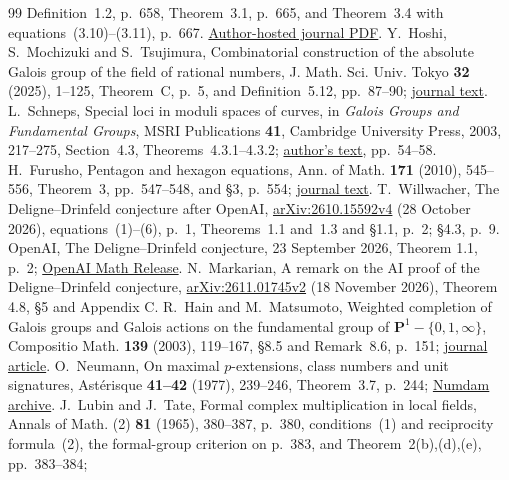 \documentclass[11pt,a4paper]{article}
\theoremstyle{definition}
\theoremstyle{remark}
\begin{document}
\begin{thebibliography}{99}
Definition~1.2, p.~658, Theorem~3.1, p.~665, and
Theorem~3.4 with equations~(3.10)--(3.11), p.~667.
\href{https://webusers.imj-prg.fr/~leila.schneps/automorphisms.pdf}{Author-hosted journal PDF}.
 Y.~Hoshi, S.~Mochizuki and S.~Tsujimura,
Combinatorial construction of the absolute Galois group of the field of
rational numbers, J. Math. Sci. Univ. Tokyo \textbf{32} (2025), 1--125,
Theorem~C, p.~5, and Definition~5.12, pp.~87--90;
\href{https://www.ms.u-tokyo.ac.jp/journal/32-1-1.pdf}{journal text}.
 L.~Schneps, Special loci in moduli spaces
of curves, in \emph{Galois Groups and Fundamental Groups}, MSRI
Publications \textbf{41}, Cambridge University Press, 2003, 217--275,
Section~4.3, Theorems~4.3.1--4.3.2;
\href{https://webusers.imj-prg.fr/~leila.schneps/MSRI.pdf}{author's text},
pp.~54--58.
 H.~Furusho, Pentagon and hexagon equations,
Ann. of Math. \textbf{171} (2010), 545--556,
Theorem~3, pp.~547--548, and \S3, p.~554;
\href{https://annals.math.princeton.edu/wp-content/uploads/annals-v171-n1-p13-p.pdf}{journal text}.
 T.~Willwacher, The Deligne--Drinfeld conjecture
after OpenAI, \href{https://arxiv.org/abs/2610.15592v4}{arXiv:2610.15592v4}
(28 October 2026), equations~(1)--(6), p.~1, Theorems~1.1 and~1.3 and
\S1.1, p.~2; \S4.3, p.~9.
 OpenAI, The Deligne--Drinfeld conjecture, 23 September
2026, Theorem 1.1, p.~2; \href{https://github.com/openai/math/blob/main/preprints/The-Deligne-Drinfeld-conjecture-September-23-2026/paper.pdf}{OpenAI Math Release}.
 N.~Markarian, A remark on the AI proof of the
Deligne--Drinfeld conjecture,
\href{https://arxiv.org/abs/2611.01745}{arXiv:2611.01745v2}
(18 November 2026), Theorem 4.8, \S5 and Appendix C.
 R.~Hain and M.~Matsumoto,
Weighted completion of Galois groups and Galois actions on the
fundamental group of $\mathbf P^1-\{0,1,\infty\}$,
Compositio Math. \textbf{139} (2003), 119--167,
\S8.5 and Remark~8.6, p.~151; \href{https://doi.org/10.1023/B:COMP.0000005077.42732.93}{journal article}.
 O.~Neumann, On maximal $p$-extensions, class numbers
and unit signatures, Ast\'erisque \textbf{41--42} (1977), 239--246,
Theorem~3.7, p.~244;
\href{https://www.numdam.org/article/AST_1977__41-42__239_0.pdf}{Numdam archive}.
 J.~Lubin and J.~Tate,
Formal complex multiplication in local fields,
Annals of Math. (2) \textbf{81} (1965), 380--387,
p.~380, conditions~(1) and reciprocity formula~(2), the formal-group
criterion on p.~383, and Theorem~2(b),(d),(e), pp.~383--384;

\end{thebibliography}
\end{document}

